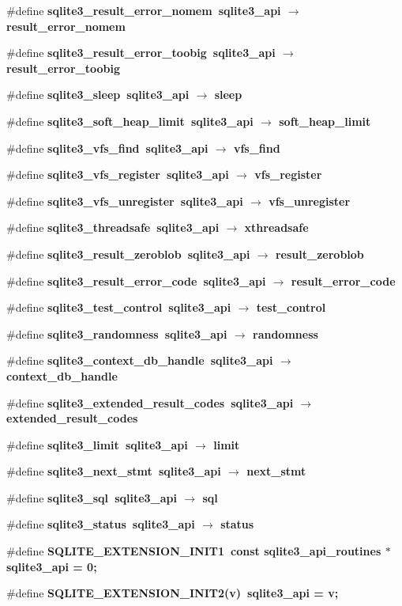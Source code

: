\begin{CompactItemize}
\item 
\#define \bf{sqlite3\_\-result\_\-error\_\-nomem}~sqlite3\_\-api $\rightarrow$ result\_\-error\_\-nomem
\item 
\#define \bf{sqlite3\_\-result\_\-error\_\-toobig}~sqlite3\_\-api $\rightarrow$ result\_\-error\_\-toobig
\item 
\#define \bf{sqlite3\_\-sleep}~sqlite3\_\-api $\rightarrow$ sleep
\item 
\#define \bf{sqlite3\_\-soft\_\-heap\_\-limit}~sqlite3\_\-api $\rightarrow$ soft\_\-heap\_\-limit
\item 
\#define \bf{sqlite3\_\-vfs\_\-find}~sqlite3\_\-api $\rightarrow$ vfs\_\-find
\item 
\#define \bf{sqlite3\_\-vfs\_\-register}~sqlite3\_\-api $\rightarrow$ vfs\_\-register
\item 
\#define \bf{sqlite3\_\-vfs\_\-unregister}~sqlite3\_\-api $\rightarrow$ vfs\_\-unregister
\item 
\#define \bf{sqlite3\_\-threadsafe}~sqlite3\_\-api $\rightarrow$ xthreadsafe
\item 
\#define \bf{sqlite3\_\-result\_\-zeroblob}~sqlite3\_\-api $\rightarrow$ result\_\-zeroblob
\item 
\#define \bf{sqlite3\_\-result\_\-error\_\-code}~sqlite3\_\-api $\rightarrow$ result\_\-error\_\-code
\item 
\#define \bf{sqlite3\_\-test\_\-control}~sqlite3\_\-api $\rightarrow$ test\_\-control
\item 
\#define \bf{sqlite3\_\-randomness}~sqlite3\_\-api $\rightarrow$ randomness
\item 
\#define \bf{sqlite3\_\-context\_\-db\_\-handle}~sqlite3\_\-api $\rightarrow$ context\_\-db\_\-handle
\item 
\#define \bf{sqlite3\_\-extended\_\-result\_\-codes}~sqlite3\_\-api $\rightarrow$ extended\_\-result\_\-codes
\item 
\#define \bf{sqlite3\_\-limit}~sqlite3\_\-api $\rightarrow$ limit
\item 
\#define \bf{sqlite3\_\-next\_\-stmt}~sqlite3\_\-api $\rightarrow$ next\_\-stmt
\item 
\#define \bf{sqlite3\_\-sql}~sqlite3\_\-api $\rightarrow$ sql
\item 
\#define \bf{sqlite3\_\-status}~sqlite3\_\-api $\rightarrow$ status
\item 
\#define \bf{SQLITE\_\-EXTENSION\_\-INIT1}~const \bf{sqlite3\_\-api\_\-routines} $\ast$sqlite3\_\-api = 0;
\item 
\#define \bf{SQLITE\_\-EXTENSION\_\-INIT2}(v)~sqlite3\_\-api = v;
\end{CompactItemize}
